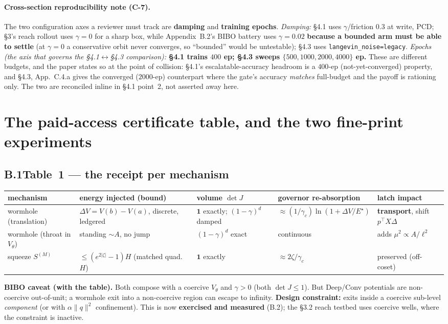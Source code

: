 \documentclass[11pt]{article}
\newcommand{\detJ}{\det J}
\begin{document}
\paragraph{Cross-section reproducibility note (C-7).} The two configuration axes a reviewer must track are \textbf{damping} and \textbf{training epochs}. \emph{Damping:} \S4.1 uses $\gamma$/friction $0.3$ at write, PCD; \S3's reach rollout uses $\gamma=0$ for a sharp box, while Appendix~B.2's BIBO battery uses $\gamma=0.02$ \textbf{because a bounded arm must be able to settle} (at $\gamma=0$ a conservative orbit never converges, so ``bounded'' would be untestable); \S4.3 uses \texttt{langevin\_noise=legacy}. \emph{Epochs (the axis that governs the \S4.1$\leftrightarrow$\S4.3 comparison):} \textbf{\S4.1 trains $400$ ep; \S4.3 sweeps $\{500,1000,2000,4000\}$ ep.} These are different budgets, and the paper states so at the point of collision: \S4.1's escalatable-accuracy headroom is a $400$-ep (not-yet-converged) property, and \S4.3, App.~C.4.a gives the converged ($2000$-ep) counterpart where the gate's accuracy \emph{matches} full-budget and the payoff is rationing only. The two are reconciled inline in \S4.1 point~2, not asserted away here.

\section{The paid-access certificate table, and the two fine-print experiments}
\subsection*{B.1\quad Table~1 --- the receipt per mechanism}
\begin{center}\footnotesize
\begin{tabular}{p{2.6cm}p{2.3cm}p{1.8cm}p{3.0cm}p{2.5cm}}
\toprule
mechanism & energy injected (bound) & volume $\detJ$ & governor re-absorption & latch impact \\
\midrule
wormhole (translation) & $\Delta V{=}V(b){-}V(a)$, discrete, ledgered & $\mathbf{1}$ exactly; $(1{-}\gamma)^d$ damped & $\approx(1/\gamma_c)\ln(1{+}\Delta V/E^\star)$ & \textbf{transport}, shift $p^\top X\Delta$ \\
wormhole (throat in $V_\theta$) & standing $\sim A$, no jump & $(1{-}\gamma)^d$ exact & continuous & adds $\mu^2{\propto}A/\ell^2$ \\
squeeze $S^{(M)}$ & $\le(e^{2|\zeta|}{-}1)H$ (matched quad.\ $H$) & $\mathbf{1}$ exactly & $\approx2\zeta/\gamma_c$ & preserved (off-coset) \\
\bottomrule
\end{tabular}
\end{center}
\textbf{BIBO caveat (with the table).} Both compose with a coercive $V_\theta$ and $\gamma>0$ (both $\detJ\le1$). But Deep/Conv potentials are non-coercive out-of-unit; a wormhole exit into a non-coercive region can escape to infinity. \textbf{Design constraint:} exits inside a coercive sub-level \emph{component} (or with $\alpha\|q\|^2$ confinement). This is now \textbf{exercised and measured} (B.2); the \S3.2 reach testbed uses coercive wells, where the constraint is inactive.
\end{document}
